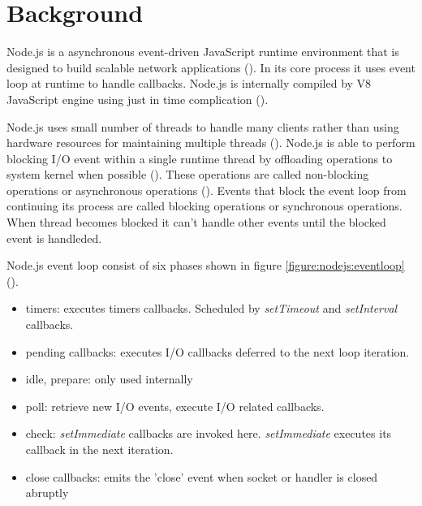 \chapter{Background\label{background}}
Node.js is a asynchronous event-driven JavaScript runtime environment that is designed to build scalable network applications (\cite{node.jsAbout}).
In its core process it uses event loop at runtime to handle callbacks.
Node.js is internally compiled by V8 JavaScript engine using just in time complication (\cite{nodejsTheV8}).

Node.js uses small number of threads to handle many clients rather than using hardware resources for maintaining multiple threads (\cite{node.jsOverviewBlockVsNonBlock}).
Node.js is able to perform blocking I/O event within a single runtime thread by offloading operations to system kernel when possible (\cite{node.jsEventLoop}).
These operations are called non-blocking operations or asynchronous operations (\cite{node.jsOverviewBlockVsNonBlock}).
Events that block the event loop from continuing its process are called blocking operations or synchronous operations.
When thread becomes blocked it can't handle other events until the blocked event is handleded.

Node.js event loop consist of six phases shown in figure \ref{figure:nodejs:eventloop} (\cite{node.jsEventLoop}).
\begin{itemize}
    \item
    timers: executes timers callbacks. Scheduled by \textit{setTimeout} and \textit{setInterval} callbacks.
    \item
    pending callbacks: executes I/O callbacks deferred to the next loop iteration.
    \item
    idle, prepare: only used internally
    \item
    poll: retrieve new I/O events, execute I/O related callbacks.
    \item
    check: \textit{setImmediate} callbacks are invoked here. \textit{setImmediate} executes its callback in the next iteration.
    \item
    close callbacks: emits the 'close' event when socket or handler is closed abruptly
\end{itemize}

